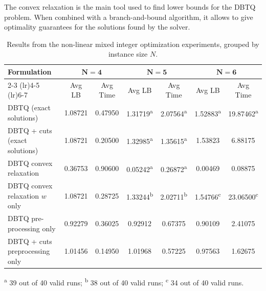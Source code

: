 \documentclass[12pt,a4paper]{article}
\numberwithin{equation}{section}
\theoremstyle{mytheorem}
\theoremstyle{myremark}
\theoremstyle{myparagraph}
\begin{document}
    The convex relaxation is the main tool used to find lower bounds for the DBTQ problem. When combined with a branch-and-bound
    algorithm, it allows to give optimality guarantees for the solutions found by the solver. 


    \begin{table}[ht]
        \centering
        \scriptsize
        \renewcommand{\arraystretch}{1.2}
        \setlength{\tabcolsep}{6pt}
        \begin{threeparttable}
            \begin{tabular}{l cc|cc|cc}
                \toprule
                \textbf{Formulation} & \multicolumn{2}{c|}{\(\mathbf{N=4}\)} & \multicolumn{2}{c|}{\(\mathbf{N=5}\)} & \multicolumn{2}{c}{\(\mathbf{N=6}\)} \\
                \cmidrule(lr){2-3} \cmidrule(lr){4-5} \cmidrule(lr){6-7}
                & Avg LB  & Avg Time & Avg LB                     & Avg Time                   & Avg LB                     & Avg Time                    \\
                \midrule
                DBTQ (exact solutions)            & 1.08721 & 0.47950  & 1.31719\textsuperscript{a} & 2.07564\textsuperscript{a} & 1.52883\textsuperscript{a} & 19.87462\textsuperscript{a} \\
                DBTQ + cuts (exact solutions)     & 1.08721 & 0.20500  & 1.32985\textsuperscript{a} & 1.35615\textsuperscript{a} & 1.53823                    & 6.88175                     \\
                DBTQ convex relaxation            & 0.36753 & 0.90600  & 0.05242\textsuperscript{a} & 0.26872\textsuperscript{a} & 0.00469           & 0.08875           \\
                DBTQ convex relaxation \(w\) only & 1.08721 & 0.28725  & 1.33244\textsuperscript{b} & 2.02711\textsuperscript{b} & 1.54766\textsuperscript{c} & 23.06500\textsuperscript{c} \\
                DBTQ pre-processing only          & 0.92279 & 0.36025  & 0.92912                    & 0.67375                    & 0.90109                    & 2.41075                     \\
                DBTQ + cuts preprocessing only    & 1.01456 & 0.14950  & 1.01968                    & 0.57225                    & 0.97563                    & 1.62675                     \\
                \bottomrule
            \end{tabular}
            \begin{tablenotes}
                \footnotesize
                \item[] \textsuperscript{a} 39 out of 40 valid runs; \textsuperscript{b} 38 out of 40 valid runs; \textsuperscript{c} 34 out of 40 valid runs.
            \end{tablenotes}
        \end{threeparttable}
        \caption{Results from the non-linear mixed integer optimization experiments, grouped by instance size \(N\).}
        \label{tab:relaxation_results}
    \end{table}
\end{document}
